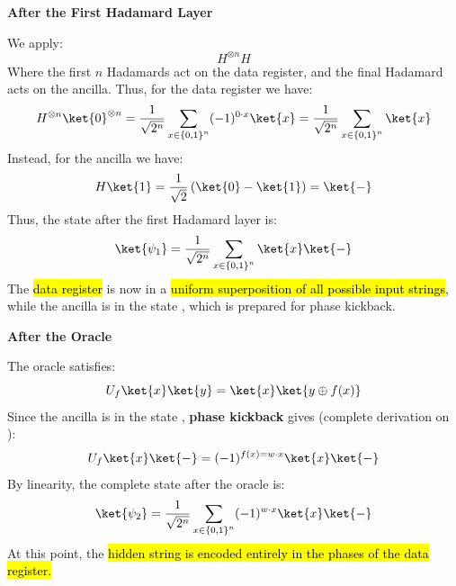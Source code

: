 \highspace
\begin{flushleft}
    \textcolor{Green3}{ \textbf{After the First Hadamard Layer}}
\end{flushleft}
We apply:
\begin{equation*}
    H^{\otimes n} H
\end{equation*}
Where the first $n$ Hadamards act on the data register, and the final Hadamard acts on the ancilla. Thus, for the data register we have:
\begin{equation*}
    H^{\otimes n} \ket{0}^{\otimes n} = \frac{1}{\sqrt{2^n}} \sum_{x \in \left\{0,1\right\}^n} (-1)^{0 \cdot x} \ket{x} = \frac{1}{\sqrt{2^n}} \sum_{x \in \left\{0,1\right\}^n} \ket{x}
\end{equation*}
Instead, for the ancilla we have:
\begin{equation*}
    H \ket{1} = \frac{1}{\sqrt{2}} \left( \ket{0} - \ket{1} \right) = \ket{-}
\end{equation*}
Thus, the state after the first Hadamard layer is:
\begin{equation}
    \ket{\psi_1} = \frac{1}{\sqrt{2^n}} \sum_{x \in \left\{0,1\right\}^n} \ket{x} \ket{-}
\end{equation}
The \hl{data register} is now in a \hl{uniform superposition of all possible input strings}, while the ancilla is in the state \ket{-}, which is prepared for phase kickback.

\highspace
\begin{flushleft}
    \textcolor{Green3}{ \textbf{After the Oracle}}
\end{flushleft}
The oracle satisfies:
\begin{equation*}
    U_f \ket{x} \ket{y} = \ket{x} \ket{y \oplus f(x)}
\end{equation*}
Since the ancilla is in the state \ket{-}, \textbf{phase kickback} gives (complete derivation on ):
\begin{equation*}
    U_f \ket{x} \ket{-} = (-1)^{f(x) = w \cdot x} \ket{x} \ket{-}
\end{equation*}
By linearity, the complete state after the oracle is:
\begin{equation}
    \ket{\psi_2} = \frac{1}{\sqrt{2^n}} \sum_{x \in \left\{0,1\right\}^n} (-1)^{w \cdot x} \ket{x} \ket{-}
\end{equation}
At this point, the \hl{hidden string is encoded entirely in the phases of the data register.}

